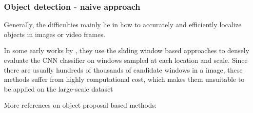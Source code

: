 \begin{frame}
	\frametitle{Object detection - naive approach}
	
	
	Generally, the difficulties mainly lie in how to accurately and efficiently localize objects in images or video frames.
	
	\bigskip
	
	In some early works by \cite{vaillant1994original, nowlan1995convolutional, girshick2015deformable}, they use the sliding window based approaches to densely evaluate the CNN classifier on windows sampled at each location and scale. Since there are usually hundreds of thousands of candidate windows in a image, these methods suffer from highly computational cost, which makes them unsuitable to be applied on the large-scale dataset
	
	\bigskip
	
	More references on object proposal based methods: 

\smallskip 

 
 
	
\end{frame}

